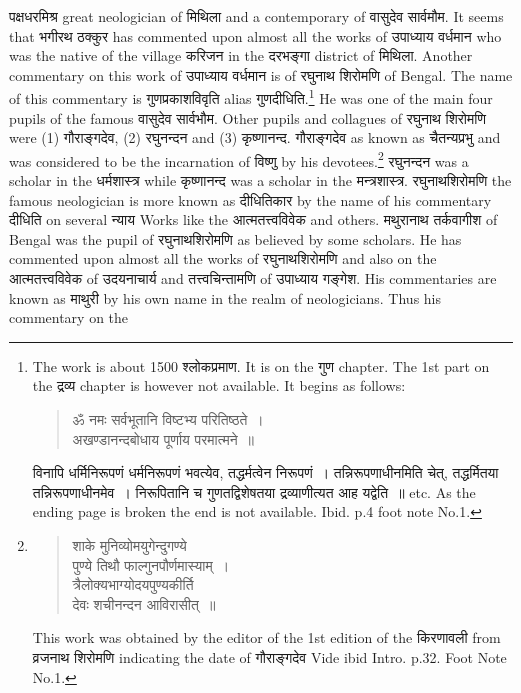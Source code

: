 \documentclass[11pt, openany]{book}
\begin{document}
\newpage
\noindent
पक्षधरमिश्र great neologician of मिथिला and a contemporary of वासुदेव सार्वमौम. It seems that भगीरथ ठक्कुर has commented upon almost all the works of उपाध्याय वर्धमान who was the native of the village करिजन in the दरभङ्गा district of मिथिला. Another commentary on this work of उपाध्याय वर्धमान is of रघुनाथ शिरोमणि of Bengal. The name of this commentary is गुणप्रकाशविवृति alias गुणदीधिति.\renewcommand{\thefootnote}{1}\footnote{The work is about 1500 श्लोकप्रमाण. It is on the गुण chapter. The 1st part on the द्रव्य chapter is however not available. It begins as follows: \textendash
 \begin{quote}
{\qt ॐ नमः सर्वभूतानि विष्टभ्य परितिष्ठते~।\\
अखण्डानन्दबोधाय पूर्णाय परमात्मने~॥}
 \end{quote}
विनापि धर्मिनिरूपणं धर्मनिरूपणं भवत्येव, तद्धर्मत्वेन निरूपणं~। तन्निरूपणाधीनमिति चेत्,
तद्धर्मितया तन्निरूपणाधीनमेव~। निरूपितानि च गुणतद्विशेषतया द्रव्याणीत्यत आह यद्वेति~॥
etc. As the ending page is broken the end is not available. Ibid. p.4 foot note No.1.} He was one of the main four pupils of the famous वासुदेव सार्वभौम. Other pupils and collagues of रघुनाथ शिरोमणि were (1) गौराङ्गदेव, (2) रघुनन्दन and (3) कृष्णानन्द. गौराङ्गदेव as known as चैतन्यप्रभु and was considered to be the incarnation of विष्णु by his devotees.\renewcommand{\thefootnote}{2}\footnote{\begin{quote}
{\qt शाके मुनिव्योमयुगेन्दुगण्ये\\
पुण्ये तिथौ फाल्गुनपौर्णमास्याम्~।\\
त्रैलोक्यभाग्योदयपुण्यकीर्ति \textendash\ \\
देवः शचीनन्दन आविरासीत्~॥}
\end{quote}
\noindent
This work was obtained by the editor of the 1st edition of the किरणावली from व्रजनाथ शिरोमणि indicating the date of गौराङ्गदेव Vide ibid Intro. p.32. Foot Note No.1.} रघुनन्दन was a scholar in the धर्मशास्त्र while कृष्णानन्द was a scholar in the मन्त्रशास्त्र. रघुनाथशिरोमणि the famous neologician is more known as दीधितिकार by the name of his commentary दीधिति on several न्याय Works like the आत्मतत्त्वविवेक and others. मथुरानाथ तर्कवागीश of Bengal was the pupil of रघुनाथशिरोमणि as believed by some scholars. He has commented upon almost all the works of रघुनाथशिरोमणि and also on the आत्मतत्त्वविवेक of उदयनाचार्य and तत्त्वचिन्तामणि of उपाध्याय गङ्गेश. His commentaries are known as माथुरी by his own name in the realm of neologicians. Thus his commentary on the
\end{document}
